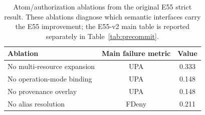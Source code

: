 \begin{table}[t]
\centering
\small
\caption{Atom/authorization ablations from the original E55 strict result. These ablations diagnose which semantic interfaces carry the E55 improvement; the E55-v2 main table is reported separately in Table~\ref{tab:precommit}.}
\label{tab:ablation}
\begin{tabular}{lcc}
\toprule
Ablation & Main failure metric & Value \\
\midrule
No multi-resource expansion & UPA & 0.333 \\
No operation-mode binding & UPA & 0.148 \\
No provenance overlay & UPA & 0.148 \\
No alias resolution & FDeny & 0.211 \\
\bottomrule
\end{tabular}
\end{table}
